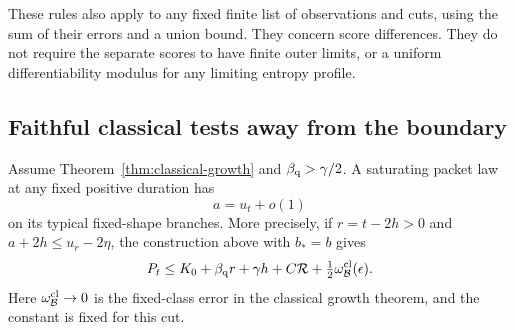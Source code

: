 These rules also apply to any fixed finite list of observations and
cuts, using the sum of their errors and a union bound.  They concern
score differences.  They do not require the separate scores to have
finite outer limits, or a uniform differentiability modulus for any
limiting entropy profile.

\subsection{Faithful classical tests away from the boundary}

\begin{lemma}
\label{lem:packet-boundary-slack}
Assume Theorem~\ref{thm:classical-growth} and
$\beta_{\mathrm q}>\gamma/2$.  A saturating packet law at any fixed positive
duration has
\begin{equation}\label{eq:active-packet-boundary}
 a=u_t+o(1)
\end{equation}
on its typical fixed-shape branches.
More precisely, if $r=t-2h>0$ and
$a+2h\le u_r-2\eta$, the construction above with $b_*=b$ gives
\begin{equation}\label{eq:off-boundary-finite-growth}
 P_t\le K_0+\beta_{\mathrm q} r+\gamma h
              +C\mathcal R+\tfrac12\omega^{\rm cl}_{\mathcal B}(\epsilon).
\end{equation}
Here $\omega^{\rm cl}_{\mathcal B}\to0$ is the fixed-class error in
the classical growth theorem, and the constant is fixed for this cut.
\end{lemma}

